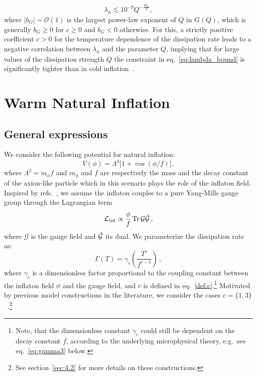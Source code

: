 \documentclass[a4paper,11pt]{article}
\begin{document}
\begin{equation}
        \lambda_\phi \lesssim 10^{-9} Q^{-\frac{4b_G}{3}}, \label{eq:lambda_bound}
\end{equation}
where $|b_G|\sim\mathcal{O}(1)$ is the largest power-law exponent of $Q$ in $G(Q)$, which is generally $b_G \geq0$ for $c\geq0$ and $b_G <0$ otherwise. For this, a strictly positive coefficient $c>0$ for the temperature dependence of the dissipation rate leads to a negative correlation between $\lambda_\phi$ and the parameter $Q$, implying that for large values of the dissipation strength $Q$ the constraint in eq.~\eqref{eq:lambda_bound} is significantly tighter than in cold inflation~\cite{Montefalcone:2022owy}.

\section{Warm Natural Inflation \label{sec:3}}

\subsection{General expressions}
\label{sec:3.1}

We consider the following potential for natural inflation:
\begin{equation}
    V(\phi)=\Lambda^4 \Big[ 1+ \cos(\phi/f)\Big], \label{eq:3.1}
\end{equation}
where $\Lambda^2=m_\phi f$ and $m_\phi$ and $f$ are respectively the mass and the decay constant of the axion-like particle which in this scenario plays the role of the inflaton field. Inspired by refs.~\cite{Berghaus:2019whh, Berghaus:2020ekh, DeRocco:2021rzv}, we assume the inflaton couples to a pure Yang-Mills gauge group through the Lagrangian term
\begin{equation}
    \mathcal{L}_{\mathrm{int}} \propto \frac{\phi}{f} \,\mathrm{Tr}\,\mathcal{G}\Tilde{\mathcal{G}}\,,
\end{equation}
where $\mathcal G$ is the gauge field and $\Tilde{\mathcal{G}}$ its dual. We parameterize the dissipation rate as:
\begin{equation}
    \label{eq:tempdepofdissipation}
    \Gamma(T)=\gamma_c \left(\frac{T^c}{f^{c-1}}\right)\,,
\end{equation}
where $\gamma_c$ is a dimensionless factor proportional to the coupling constant between the inflaton field $\phi$ and the gauge field, and $c$ is defined in eq.~\eqref{def:c}.\footnote{Note, that the dimensionless constant $\gamma_c$ could still be dependent on the decay constant $f$, according to the underlying microphysical theory, e.g.\ see eq.~\eqref{eq:gamma3} below.} Motivated by previous model constructions in the literature, we consider the cases $c=\{1,3\}$~\cite{Berghaus:2019whh, Berghaus:2020ekh}.\footnote{See section~\ref{sec:4.2} for more details on these constructions.}
\end{document}
